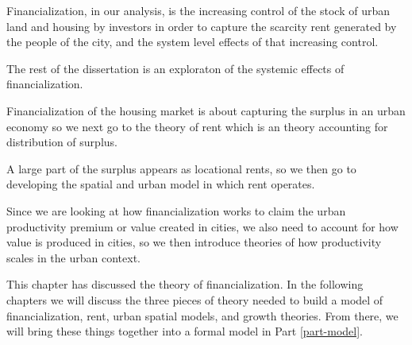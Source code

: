 
Financialization, in our analysis, is the increasing control of the stock of urban land and housing by investors in order to capture the scarcity rent generated by the people of the city, and the system level effects of that increasing control.  


The rest of the dissertation is an exploraton of the systemic effects of financialization. 


Financialization of the housing market is about capturing the surplus in an urban economy so we next go to the theory of rent which is an theory accounting for distribution of surplus. 

A large part of the surplus appears as locational rents, so we then go to developing the spatial and urban model in which rent operates.  

Since we are looking at how financialization works to claim the urban productivity premium or value created in cities, we also need to account for how value is produced in cities, so we then introduce theories of how productivity scales in the urban context.

    


This chapter has discussed the theory of financialization. In the following chapters we will discuss the three pieces of theory needed to build a model of financialization, rent, urban spatial models, and growth theories. From there, we will bring these things together into a formal model in Part \ref{part-model}.